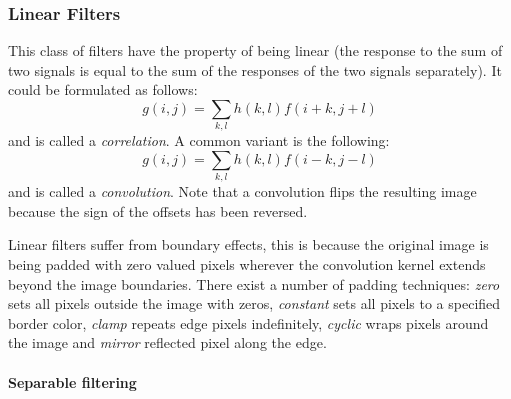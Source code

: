 \documentclass[a4paper,twocolumn]{article}
\begin{document}
\subsubsection{Linear Filters}
This class of filters have the property of being linear (the response to the sum
of two signals is equal to the sum of the responses of the two signals
separately). It could be formulated as follows:
\begin{equation}
g(i, j) = \sum_{k,l} h(k, l) f(i + k, j + l)
\end{equation}
and is called a \textit{correlation}. A common variant is the following:
\begin{equation}
g(i, j) = \sum_{k,l} h(k, l) f(i - k , j - l)
\end{equation}
and is called a \textit{convolution}. Note that a convolution flips the
resulting image because the sign of the offsets has been reversed.

Linear filters suffer from boundary effects, this is because the original image
is being padded with zero valued pixels wherever the convolution kernel extends
beyond the image boundaries. There exist a number of padding techniques:
\textit{zero} sets all pixels outside the image with zeros, \textit{constant}
sets all pixels to a specified border color, \textit{clamp} repeats edge pixels
indefinitely, \textit{cyclic} wraps pixels around the image and \textit{mirror}
reflected pixel along the edge.

\paragraph{Separable filtering}
\end{document}
